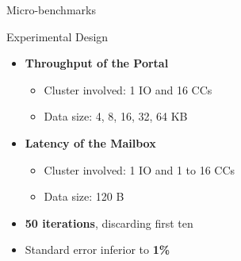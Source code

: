 	\begin{frame}[fragile]{Micro-benchmarks}
		\begin{overprint}
		\end{overprint}
	\end{frame}

	\begin{frame}[fragile]{Experimental Design}
		\begin{itemize}
			\item \textbf{Throughput of the Portal}
			\begin{itemize}
				\item Cluster involved: 1 IO and 16 CCs
				\item Data size: 4, 8, 16, 32, 64 KB
			\end{itemize}
			\item \textbf{Latency of the Mailbox}
			\begin{itemize}
				\item Cluster involved: 1 IO and 1 to 16 CCs
				\item Data size: 120 B
			\end{itemize}
			\item \textbf{50 iterations}, discarding first ten
			\item Standard error inferior to \textbf{1\%}
		\end{itemize}
	\end{frame}

